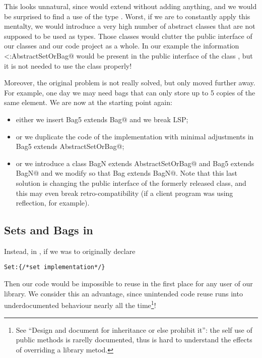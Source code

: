 This looks unnatural, since \Q@Set@ would extend \Q@AbstractSetOrBag@ without adding anything,
and we would be surprised to find a use of the type \Q@AbstractSetOrBag@.
Worst, if we are to constantly apply this mentalty, we would introduce a very high number
of abstract classes that are not supposed to be used as types. Those classes would clutter the 
public interface of our classes and our code project as a whole.
In our example the information \Q@Set<:AbstractSetOrBag@ would be present in the public interface
of the class \Q@Set@, but it is not needed to use the class properly!

Moreover, the original problem is not really solved, but only moved 
further away. For example, one day  we may need bags that can only store up to 5 copies of the same element.
We are now at the starting point again:
\begin{itemize}
\item either we insert \Q@class Bag5 extends Bag@ and we break LSP; 
\item or we duplicate the code of the \Q@Bag@ implementation with minimal
  adjustments in \Q@class Bag5 extends AbstractSetOrBag@;
\item or we introduce a
\Q@abstract class BagN extends AbstractSetOrBag@ and \Q@class Bag5 extends BagN@
and we modify \Q@Bag@ so that  \Q@class Bag extends BagN@.
Note that this last solution is changing the public interface of the formerly released \Q@Bag@ class, and
this may even break retro-compatibility (if a client program was using
reflection, for example).
\end{itemize}

\subsection{Sets and Bags in \name}
Instead, in \name, if we was to originally declare
\begin{lstlisting}
Set:{/*set implementation*/} 
\end{lstlisting}
Then our code would be impossible to reuse in the first place for any user of our library.
We consider this an advantage, since unintended code reuse runs into underdocumented behaviour nearly all the time\footnote{See
``Design and document for inheritance or else prohibit
it''\cite{Bloch08}: the
self use of public methods is rarelly documented, thus is hard to understand the effects of overriding a library metod.
}!

